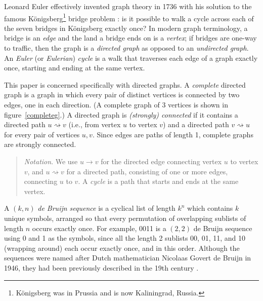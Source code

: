 \documentclass[12pt]{article}
\begin{document}
Leonard Euler effectively invented graph theory in 1736 with his solution to the famous K\"onigsberg\footnote{K\"onigsberg was in Prussia and is now Kaliningrad, Russia.} bridge problem \cite{euler,wilson}: is it possible to walk a cycle across each of the seven bridges in K\"onigsberg exactly once? In modern graph terminology, a bridge is an \emph{edge\/} and the land a bridge ends on is a \emph{vertex\/}; if bridges are one-way to traffic, then the graph is a \emph{directed graph\/} as opposed to an \emph{undirected graph\/}. An \emph{Euler\/} (or \emph{Eulerian\/}) \emph{cycle\/} is a walk that traverses each edge of a graph exactly once, starting and ending at the same vertex.%

This paper is concerned specifically with directed graphs. A \emph{complete\/} directed graph is a graph in which every pair of distinct vertices is connected by two edges, one in each direction. (A complete graph of 3 vertices is shown in figure~\ref{completeg}.) A directed graph is \emph{(strongly) connected\/} if it contains a directed path $u \rightsquigarrow v$ (i.e., from vertex $u$ to vertex $v$) and a directed path $v \rightsquigarrow u$ for every pair of vertices $u,v$. Since edges are paths of length 1, complete graphs are strongly connected.

\begin{quote}\raggedright\emph{Notation}. We use $u \rightarrow v$ for the directed edge connecting vertex $u$ to vertex $v$, and $u \rightsquigarrow v$ for a directed path, consisting of one or more edges, connecting $u$ to $v$. A \emph{cycle\/} is a path that starts and ends at the same vertex.\end{quote}


A $(k,n)$ \emph{de Bruijn sequence\/} is a cyclical list of length $k^n$ which contains $k$ unique symbols, arranged so that every permutation of overlapping sublists of length $n$ occurs exactly once. For example, 0011 is a $(2,2)$ de Bruijn sequence using 0 and 1 as the symbols, since all the length 2 sublists 00, 01, 11, and 10 (wrapping around) each occur exactly once, and in this order.
Although the sequences were named after Dutch mathematician Nicolaas Govert de Bruijn \cite{debruijn} in 1946, they had been previously described in the  19th century \cite{fleury,sainte-marie}.
\end{document}
